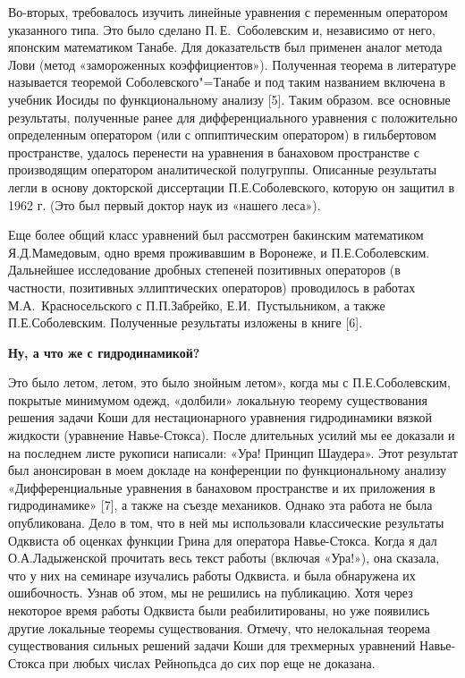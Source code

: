 Во-вторых, требовалось изучить линейные уравнения с переменным оператором указанного типа.
Это было сделано П.\,Е.~Соболевским и, независимо от него, японским математиком Танабе.
Для доказательств был применен аналог метода Лови (метод «замороженных коэффициентов»).
Полученная теорема в литературе называется теоремой Соболевского"=Танабе и под таким названием
включена в учебник Иосиды по функциональному анализу [5].
Таким образом. все основные результаты,
полученные ранее для дифференциального уравнения с положительно определенным оператором (или с оппиптическим оператором)
в гильбертовом пространстве,
удалось перенести на уравнения в банаховом пространстве с производящим оператором аналитической полугруппы. Описанные результаты легли в основу докторской диссертации П.Е.Соболевского, которую он защитил в 1962 г. (Это был первый доктор наук из «нашего леса»).

Еще более общий класс уравнений был рассмотрен бакинским математиком Я.Д.Мамедовым, одно время проживавшим в Воронеже,
и П.Е.Соболевским. Дальнейшее исследование дробных степеней позитивных операторов
(в частности, позитивных эллиптических операторов) проводилось в работах М.А.~Красносельского с П.П.Забрейко, Е.И.~Пустыльником, а также П.Е.Соболевским. Полученные результаты изложены в книге [6].

{\bf Ну, а что же с гидродинамикой?}

Это было летом, летом, это было знойным летом», когда мы с П.Е.Соболевским, покрытые минимумом одежд, «долбили» локальную теорему существования решения задачи Коши для нестационарного уравнения гидродинамики вязкой жидкости (уравнение Навье-Стокса). После длительных усилий мы ее доказали и на последнем листе рукописи написали: «Ура! Принцип Шаудера». Этот результат был анонсирован в моем докладе на конференции по функциональному анализу «Дифференциальные уравнения в банаховом пространстве и их приложения в гидродинамике» [7], а также на съезде механиков. Однако эта работа не была опубликована. Дело в том, что в ней мы использовали классические результаты Одквиста об оценках функции Грина для оператора Навье-Стокса. Когда я дал О.А.Ладыженской прочитать весь текст работы (включая «Ура!»), она сказала, что у них на семинаре изучались работы Одквиста. и была обнаружена их ошибочность. Узнав об этом, мы не решились на публикацию. Хотя через некоторое время работы Одквиста были реабилитированы, но уже появились другие локальные теоремы существования. Отмечу, что нелокальная теорема существования сильных решений задачи Коши для трехмерных уравнений Навье-Стокса при любых числах Рейнопьдса до сих пор еще не доказана.

